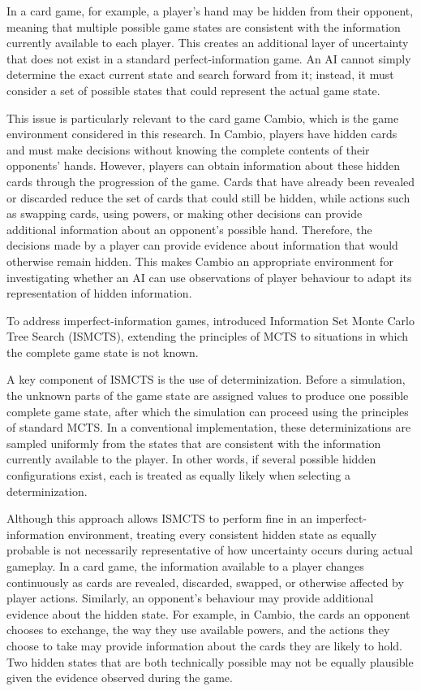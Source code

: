 \documentclass[12pt,a4paper,oneside]{report}
\begin{document}
In a card game, for example, a player's hand may be hidden from their opponent, meaning that multiple possible game states are consistent with the information currently available to each player. This creates an additional layer of uncertainty that does not exist in a standard perfect-information game. An AI cannot simply determine the exact current state and search forward from it; instead, it must consider a set of possible states that could represent the actual game state.

This issue is particularly relevant to the card game Cambio, which is the game environment considered in this research. In Cambio, players have hidden cards and must make decisions without knowing the complete contents of their opponents' hands. However, players can obtain information about these hidden cards through the progression of the game. Cards that have already been revealed or discarded reduce the set of cards that could still be hidden, while actions such as swapping cards, using powers, or making other decisions can provide additional information about an opponent's possible hand. Therefore, the decisions made by a player can provide evidence about information that would otherwise remain hidden. This makes Cambio an appropriate environment for investigating whether an AI can use observations of player behaviour to adapt its representation of hidden information.

To address imperfect-information games, \textcite{cowling2012ismcts} introduced Information Set Monte Carlo Tree Search (ISMCTS), extending the principles of MCTS to situations in which the complete game state is not known.

A key component of ISMCTS is the use of determinization. Before a simulation, the unknown parts of the game state are assigned values to produce one possible complete game state, after which the simulation can proceed using the principles of standard MCTS. In a conventional implementation, these determinizations are sampled uniformly from the states that are consistent with the information currently available to the player. In other words, if several possible hidden configurations exist, each is treated as equally likely when selecting a determinization.

Although this approach allows ISMCTS to perform fine in an imperfect-information environment, treating every consistent hidden state as equally probable is not necessarily representative of how uncertainty occurs during actual gameplay. In a card game, the information available to a player changes continuously as cards are revealed, discarded, swapped, or otherwise affected by player actions. Similarly, an opponent's behaviour may provide additional evidence about the hidden state. For example, in Cambio, the cards an opponent chooses to exchange, the way they use available powers, and the actions they choose to take may provide information about the cards they are likely to hold. Two hidden states that are both technically possible may not be equally plausible given the evidence observed during the game.
\end{document}
